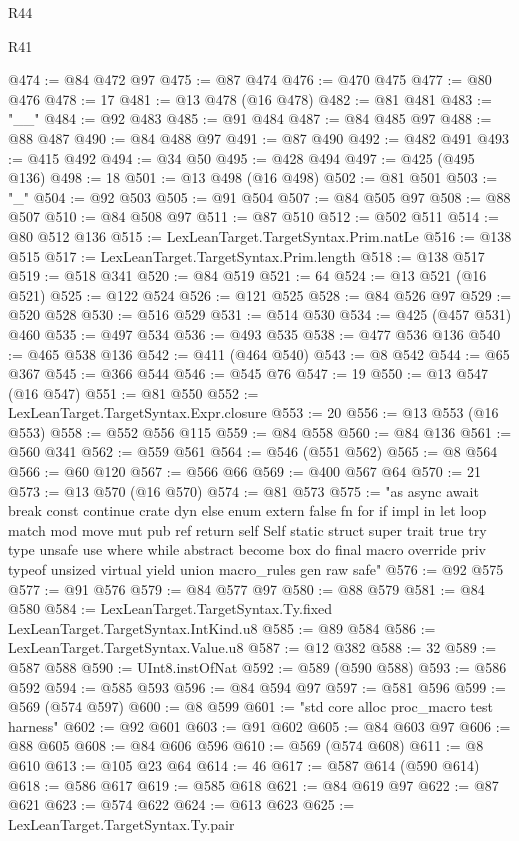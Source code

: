 \begin{lexlean}{R44}
\begin{lexlean}{R41}
\begin{coremodule}
{{{{{{{{{{{{{{{{{{{{{{{{{{{{{{{{{{{{{{{{{{{{{{{{{{{{{{{{{{{{{{{{{{{{{{{{{{{{{{{{{{{{{{{@474 := @84 @472 @97
@475 := @87 @474
@476 := @470 @475
@477 := @80 @476
@478 := 17
@481 := @13 @478 (@16 @478)
@482 := @81 @481
@483 := "__"
@484 := @92 @483
@485 := @91 @484
@487 := @84 @485 @97
@488 := @88 @487
@490 := @84 @488 @97
@491 := @87 @490
@492 := @482 @491
@493 := @415 @492
@494 := @34 @50
@495 := @428 @494
@497 := @425 (@495 @136)
@498 := 18
@501 := @13 @498 (@16 @498)
@502 := @81 @501
@503 := "_"
@504 := @92 @503
@505 := @91 @504
@507 := @84 @505 @97
@508 := @88 @507
@510 := @84 @508 @97
@511 := @87 @510
@512 := @502 @511
@514 := @80 @512 @136
@515 := LexLeanTarget.TargetSyntax.Prim.natLe
@516 := @138 @515
@517 := LexLeanTarget.TargetSyntax.Prim.length
@518 := @138 @517
@519 := @518 @341
@520 := @84 @519
@521 := 64
@524 := @13 @521 (@16 @521)
@525 := @122 @524
@526 := @121 @525
@528 := @84 @526 @97
@529 := @520 @528
@530 := @516 @529
@531 := @514 @530
@534 := @425 (@457 @531) @460
@535 := @497 @534
@536 := @493 @535
@538 := @477 @536 @136
@540 := @465 @538 @136
@542 := @411 (@464 @540)
@543 := @8 @542
@544 := @65 @367
@545 := @366 @544
@546 := @545 @76
@547 := 19
@550 := @13 @547 (@16 @547)
@551 := @81 @550
@552 := LexLeanTarget.TargetSyntax.Expr.closure
@553 := 20
@556 := @13 @553 (@16 @553)
@558 := @552 @556 @115
@559 := @84 @558
@560 := @84 @136
@561 := @560 @341
@562 := @559 @561
@564 := @546 (@551 @562)
@565 := @8 @564
@566 := @60 @120
@567 := @566 @66
@569 := @400 @567 @64
@570 := 21
@573 := @13 @570 (@16 @570)
@574 := @81 @573
@575 := "as async await break const continue crate dyn else enum extern false fn for if impl in let loop match mod move mut pub ref return self Self static struct super trait true try type unsafe use where while abstract become box do final macro override priv typeof unsized virtual yield union macro_rules gen raw safe"
@576 := @92 @575
@577 := @91 @576
@579 := @84 @577 @97
@580 := @88 @579
@581 := @84 @580
@584 := LexLeanTarget.TargetSyntax.Ty.fixed LexLeanTarget.TargetSyntax.IntKind.u8
@585 := @89 @584
@586 := LexLeanTarget.TargetSyntax.Value.u8
@587 := @12 @382
@588 := 32
@589 := @587 @588
@590 := UInt8.instOfNat
@592 := @589 (@590 @588)
@593 := @586 @592
@594 := @585 @593
@596 := @84 @594 @97
@597 := @581 @596
@599 := @569 (@574 @597)
@600 := @8 @599
@601 := "std core alloc proc_macro test harness"
@602 := @92 @601
@603 := @91 @602
@605 := @84 @603 @97
@606 := @88 @605
@608 := @84 @606 @596
@610 := @569 (@574 @608)
@611 := @8 @610
@613 := @105 @23 @64
@614 := 46
@617 := @587 @614 (@590 @614)
@618 := @586 @617
@619 := @585 @618
@621 := @84 @619 @97
@622 := @87 @621
@623 := @574 @622
@624 := @613 @623
@625 := LexLeanTarget.TargetSyntax.Ty.pair
}}}}}}}}}}}}}}}}}}}}}}}}}}}}}}}}}}}}}}}}}}}}}}}}}}}}}}}}}}}}}}}}}}}}}}}}}}}}}}}}}}}}}}}
\end{coremodule}
\end{lexlean}
\end{lexlean}

